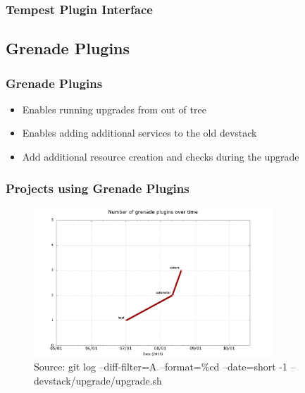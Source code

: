 \documentclass[aspectratio=169,11pt,hyperref={colorlinks=true}]{beamer}
\begin{document}
\begin{frame}
    \frametitle{Tempest Plugin Interface}
        
\end{frame}

\subsection{Grenade Plugins}
\begin{frame}
    \frametitle{Grenade Plugins}
    \begin{itemize}
        \item Enables running upgrades from out of tree
        \item Enables adding additional services to the old devstack
        \item Add additional resource creation and checks during the upgrade
    \end{itemize}
\end{frame}

\begin{frame}
	\frametitle{Projects using Grenade Plugins}
    \begin{figure}[p]
    	\centering
    	\includegraphics[width=0.8\textwidth]{grenade-plugins.png}
    	\caption{Source: git log --diff-filter=A --format=\%cd --date=short -1 -- devstack/upgrade/upgrade.sh}
    \end{figure}
\end{frame}
\end{document}
